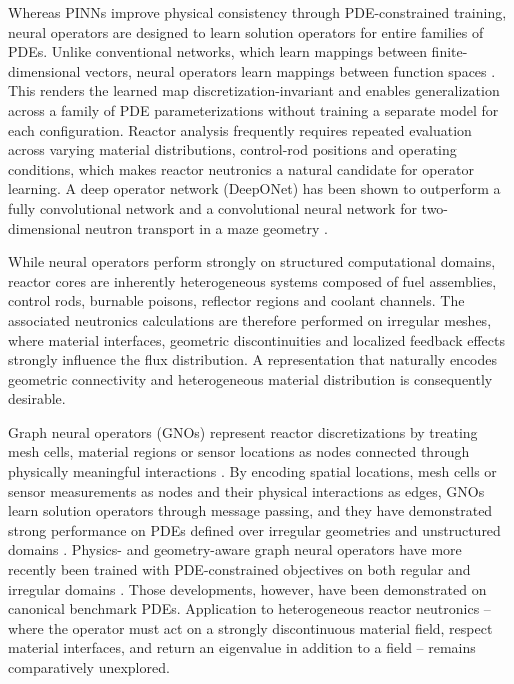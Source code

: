 \documentclass[preprint,12pt]{elsarticle}
\begin{document}
Whereas PINNs improve physical consistency through PDE-constrained training,
neural operators are designed to learn solution operators for entire families
of PDEs. Unlike conventional networks, which learn mappings between
finite-dimensional vectors, neural operators learn mappings between function
spaces \citep{kovachki2023}. This renders the learned map
discretization-invariant and enables generalization across a family of PDE
parameterizations without training a separate model for each configuration.
Reactor analysis frequently requires repeated evaluation across varying
material distributions, control-rod positions and operating conditions, which
makes reactor neutronics a natural candidate for operator learning. A deep
operator network (DeepONet) has been shown to outperform a fully convolutional
network and a convolutional neural network for two-dimensional neutron
transport in a maze geometry \citep{kobayashi2024}.

While neural operators perform strongly on structured computational domains,
reactor cores are inherently heterogeneous systems composed of fuel
assemblies, control rods, burnable poisons, reflector regions and coolant
channels. The associated neutronics calculations are therefore performed on
irregular meshes, where material interfaces, geometric discontinuities and
localized feedback effects strongly influence the flux distribution. A
representation that naturally encodes geometric connectivity and heterogeneous
material distribution is consequently desirable.

Graph neural operators (GNOs) represent reactor discretizations by treating
mesh cells, material regions or sensor locations as nodes connected through
physically meaningful interactions \citep{li2020}. By encoding spatial
locations, mesh cells or sensor measurements as nodes and their physical
interactions as edges, GNOs learn solution operators through message passing,
and they have demonstrated strong performance on PDEs defined over irregular
geometries and unstructured domains \citep{li2020}. Physics- and
geometry-aware graph neural operators have more recently been trained with
PDE-constrained objectives on both regular and irregular domains
\citep{sarkar2025}. Those developments, however, have been demonstrated on
canonical benchmark PDEs. Application to heterogeneous reactor neutronics --
where the operator must act on a strongly discontinuous material field, respect
material interfaces, and return an eigenvalue in addition to a field -- remains
comparatively unexplored.
\end{document}
